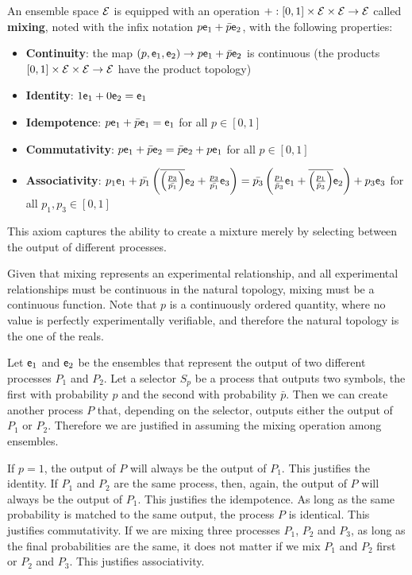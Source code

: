 \begin{axiom}
	An ensemble space $\mathcal{E}$ is equipped with an operation $+ : [0, 1] \times \mathcal{E} \times \mathcal{E} \to \mathcal{E}$ called \textbf{mixing}, noted with the infix notation $p \mathsf{e}_1 + \bar{p} \mathsf{e}_2$, with the following properties:
	\begin{itemize}
		\item \textbf{Continuity}: the map $(p, \mathsf{e}_1, \mathsf{e}_2)  \to p \mathsf{e}_1 + \bar{p} \mathsf{e}_2$ is continuous (the products $[0, 1] \times \mathcal{E} \times \mathcal{E} \to \mathcal{E}$ have the product topology)
		\item \textbf{Identity}: $1 \mathsf{e}_1 + 0 \mathsf{e}_2 = \mathsf{e}_1$
		\item \textbf{Idempotence}:  $p \mathsf{e}_1 + \bar{p} \mathsf{e}_1 = \mathsf{e}_1$ for all $p \in [0,1]$
		\item \textbf{Commutativity}: $p \mathsf{e}_1 + \bar{p} \mathsf{e}_2 = \bar{p} \mathsf{e}_2 + p \mathsf{e}_1$ for all $p \in [0,1]$
		\item \textbf{Associativity}: $p_1 \mathsf{e}_1 + \bar{p_1}\left(\overline{\left(\frac{p_3}{\bar{p_1}}\right)}\mathsf{e}_2 + \frac{p_3}{\bar{p_1}}\mathsf{e}_3\right) =  \bar{p_3}\left(\frac{p_1}{\bar{p}_3} \mathsf{e}_1 +  \overline{\left(\frac{p_1}{\bar{p}_3}\right)}\mathsf{e}_2\right) + p_3 \mathsf{e}_3$ for all $p_1, p_3 \in [0,1]$
	\end{itemize}
\end{axiom}

\begin{justification}
	This axiom captures the ability to create a mixture merely by selecting between the output of different processes.
	
	Given that mixing represents an experimental relationship, and all experimental relationships must be continuous in the natural topology, mixing must be a continuous function. Note that $p$ is a continuously ordered quantity, where no value is perfectly experimentally verifiable, and therefore the natural topology is the one of the reals.

	Let $\mathsf{e}_1$ and $\mathsf{e}_2$ be the ensembles that represent the output of two different processes $P_1$ and $P_2$. Let a selector $S_p$ be a process that outputs two symbols, the first with probability $p$ and the second with probability $\bar{p}$. Then we can create another process $P$ that, depending on the selector, outputs either the output of $P_1$ or $P_2$. Therefore we are justified in assuming the mixing operation among ensembles.

	If $p=1$, the output of $P$ will always be the output of $P_1$. This justifies the identity. If $P_1$ and $P_2$ are the same process, then, again, the output of $P$ will always be the output of $P_1$. This justifies the idempotence. As long as the same probability is matched to the same output, the process $P$ is identical. This justifies commutativity. If we are mixing three processes $P_1$, $P_2$ and $P_3$, as long as the final probabilities are the same, it does not matter if we mix $P_1$ and $P_2$ first or $P_2$ and $P_3$. This justifies associativity.
\end{justification}

